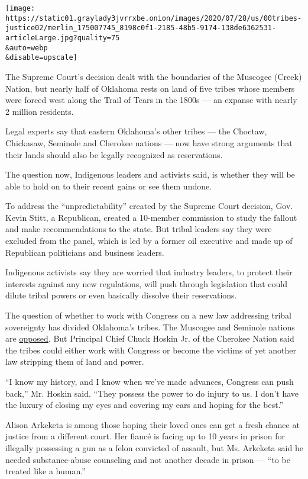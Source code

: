 \texttt{[image: https://static01.graylady3jvrrxbe.onion/images/2020/07/28/us/00tribes-justice02/merlin\_175007745\_8198c0f1-2185-48b5-9174-138de6362531-articleLarge.jpg?quality=75\\\&auto=webp\\\&disable=upscale]}

The Supreme Court's decision dealt with the boundaries of the Muscogee
(Creek) Nation, but nearly half of Oklahoma rests on land of five tribes
whose members were forced west along the Trail of Tears in the 1800s ---
an expanse with nearly 2 million residents.

Legal experts say that eastern Oklahoma's other tribes --- the Choctaw,
Chickasaw, Seminole and Cherokee nations --- now have strong arguments
that their lands should also be legally recognized as reservations.

The question now, Indigenous leaders and activists said, is whether they
will be able to hold on to their recent gains or see them undone.

To address the ``unpredictability'' created by the Supreme Court
decision, Gov. Kevin Stitt, a Republican, created a 10-member commission
to study the fallout and make recommendations to the state. But tribal
leaders say they were excluded from the panel, which is led by a former
oil executive and made up of Republican politicians and business
leaders.

Indigenous activists say they are worried that industry leaders, to
protect their interests against any new regulations, will push through
legislation that could dilute tribal powers or even basically dissolve
their reservations.

The question of whether to work with Congress on a new law addressing
tribal sovereignty has divided Oklahoma's tribes. The Muscogee and
Seminole nations are
\href{https://tulsaworld.com/news/local/crime-and-courts/creek-seminole-tribes-deny-pact-with-state-on-jurisdictional-issues/article_d5e11094-2cd8-53a6-9686-13768e05ccce.html}{opposed}.
But Principal Chief Chuck Hoskin Jr. of the Cherokee Nation said the
tribes could either work with Congress or become the victims of yet
another law stripping them of land and power.

``I know my history, and I know when we've made advances, Congress can
push back,'' Mr. Hoskin said. ``They possess the power to do injury to
us. I don't have the luxury of closing my eyes and covering my ears and
hoping for the best.''

Alison Arkeketa is among those hoping their loved ones can get a fresh
chance at justice from a different court. Her fiancé is facing up to 10
years in prison for illegally possessing a gun as a felon convicted of
assault, but Ms. Arkeketa said he needed substance-abuse counseling and
not another decade in prison --- ``to be treated like a human.''

